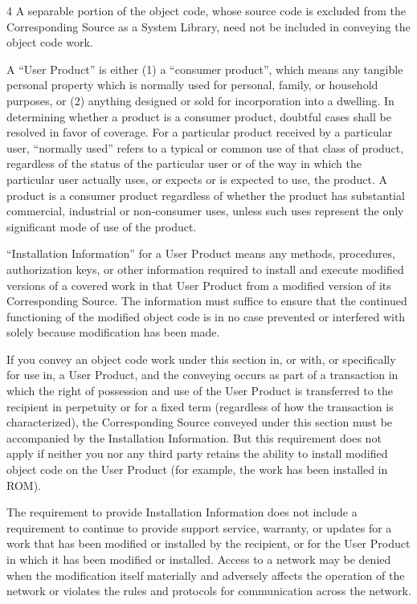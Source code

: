 \documentclass[fontsize=11pt,paper=A4,BCOR=12mm,DIV=13,open=any,listof=totoc,toc=flat]{scrbook}
\begin{document}
{\begin{multicols}{4}
A separable portion of the object code, whose source code is excluded from the Corresponding Source as a System Library, need not be included in conveying the object code work.

A “User Product” is either (1) a “consumer product”, which means any tangible personal property which is normally used for personal, family, or household purposes, or (2) anything designed or sold for incorporation into a dwelling. In determining whether a product is a consumer product, doubtful cases shall be resolved in favor of coverage. For a particular product received by a particular user, “normally used” refers to a typical or common use of that class of product, regardless of the status of the particular user or of the way in which the particular user actually uses, or expects or is expected to use, the product. A product is a consumer product regardless of whether the product has substantial commercial, industrial or non-consumer uses, unless such uses represent the only significant mode of use of the product.

“Installation Information” for a User Product means any methods, procedures, authorization keys, or other information required to install and execute modified versions of a covered work in that User Product from a modified version of its Corresponding Source. The information must suffice to ensure that the continued functioning of the modified object code is in no case prevented or interfered with solely because modification has been made.

If you convey an object code work under this section in, or with, or specifically for use in, a User Product, and the conveying occurs as part of a transaction in which the right of possession and use of the User Product is transferred to the recipient in perpetuity or for a fixed term (regardless of how the transaction is characterized), the Corresponding Source conveyed under this section must be accompanied by the Installation Information. But this requirement does not apply if neither you nor any third party retains the ability to install modified object code on the User Product (for example, the work has been installed in ROM).

The requirement to provide Installation Information does not include a requirement to continue to provide support service, warranty, or updates for a work that has been modified or installed by the recipient, or for the User Product in which it has been modified or installed. Access to a network may be denied when the modification itself materially and adversely affects the operation of the network or violates the rules and protocols for communication across the network.


\end{multicols}}
\end{document}
